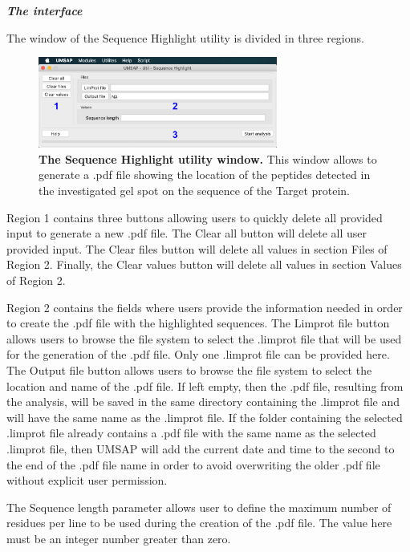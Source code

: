 \textit{\textbf{The interface}}

The window of the Sequence Highlight utility is divided in three regions. 

\begin{figure}[h]
	\centering
	\includegraphics[width=0.7\textwidth]{./IMAGES/UTIL-SEQUENCE-HIGHLIGHT/sequence-highlight.jpg}	    
	\caption[The Sequence Highlight utility window]{\textbf{The Sequence Highlight utility window.} This window allows to generate a .pdf file showing the location of the peptides detected in the investigated gel spot on the sequence of the Target protein.} 
	\label{fig:seqhighwindow}
	\vspace{-5pt} 	
\end{figure} 

Region \num{1} contains three buttons allowing users to quickly delete all provided input to generate a new .pdf file. The Clear all button will delete all user provided input. The Clear files button will delete all values in section Files of Region \num{2}. Finally, the Clear values button will delete all values in section Values of Region \num{2}.

Region \num{2} contains the fields where users provide the information needed in order to create the .pdf file with the highlighted sequences. The Limprot file button allows users to browse the file system to select the .limprot file that will be used for the generation of the .pdf file. Only one .limprot file can be provided here. The Output file button allows users to browse the file system to select the location and name of the .pdf file. If left empty, then the .pdf file, resulting from the analysis, will be saved in the same directory containing the .limprot file and will have the same name as the .limprot file. If the folder containing the selected .limprot file already contains a .pdf file with the same name as the selected .limprot file, then UMSAP will add the current date and time to the second to the end of the .pdf file name in order to avoid overwriting the older .pdf file without explicit user permission.

The Sequence length parameter allows user to define the maximum number of residues per line to be used during the creation of the .pdf file. The value here must be an integer number greater than zero.

